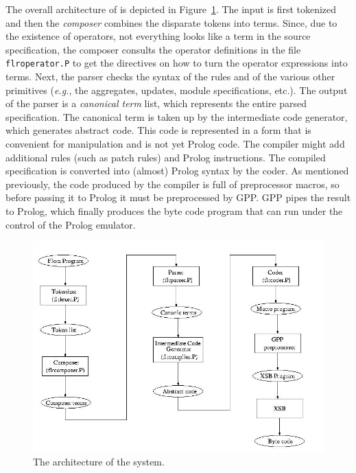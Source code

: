 \documentclass[11pt]{article}
\newcommand{\ERGO}{\mbox{\smaller{\ensuremath{\cal{E}}\smaller{{\sc{RGO}}}}}\xspace}
\newcommand{\FLSYSTEM}{\ERGO}
\begin{document}
The overall architecture of \FLSYSTEM is depicted in Figure~\ref{fig-arch}.
The input is first tokenized and then the \emph{composer} combines the
disparate tokens into terms. Since, due to the existence of operators, not
everything looks like a term in the source specification, the composer consults
the operator definitions in the file {\tt flroperator.P} to get the
directives on how to turn the operator expressions into terms. Next, the
parser checks the syntax of the rules and of the various other primitives
({\it e.g.}, the aggregates, updates, module specifications, etc.). The
output of the parser is a \emph{canonical term} list, which represents the
entire parsed specification. The canonical term is taken up by the intermediate
code generator, which generates abstract code. This code is represented in
a form that is convenient for manipulation and is not yet Prolog code.  The
compiler might add additional rules (such as patch rules) and Prolog
instructions. The compiled specification is converted into (almost) Prolog syntax
by the coder. As mentioned previously, the code produced by the compiler is
full of preprocessor macros, so before passing it to Prolog it must be
preprocessed by GPP. GPP pipes the result to Prolog, which finally produces
the byte code program that can run under the control of the Prolog
emulator.

\begin{figure}[bt]
  \begin{center}
    \includegraphics[width=5.5in]{architecture}
  \end{center}
  \caption{The architecture of the \FLSYSTEM system.}
  \label{fig-arch}
\end{figure}
\end{document}
